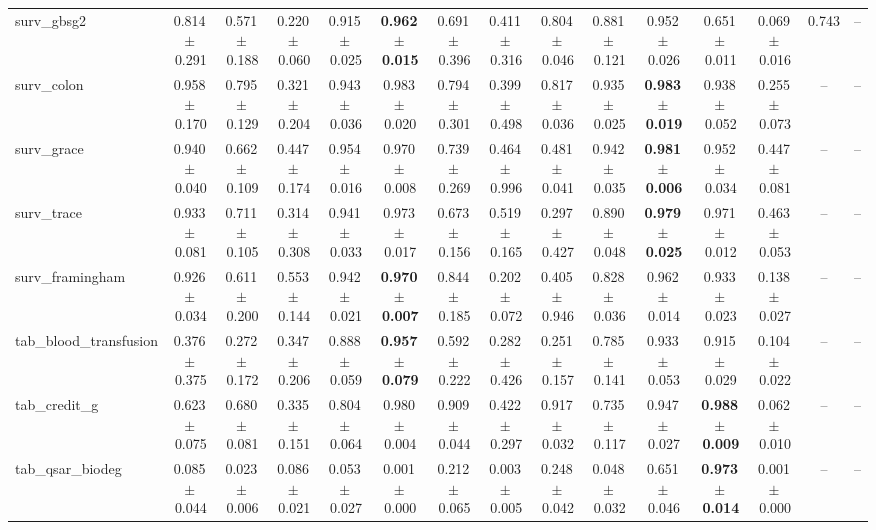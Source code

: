 \documentclass[8pt]{extarticle}
\begin{document}
\begin{longtable}{l*{14}{c}}
surv\_gbsg2 & 0.814\,$\pm$\,0.291 & 0.571\,$\pm$\,0.188 & 0.220\,$\pm$\,0.060 & 0.915\,$\pm$\,0.025 & \textbf{0.962\,$\pm$\,0.015} & 0.691\,$\pm$\,0.396 & 0.411\,$\pm$\,0.316 & 0.804\,$\pm$\,0.046 & 0.881\,$\pm$\,0.121 & 0.952\,$\pm$\,0.026 & 0.651\,$\pm$\,0.011 & 0.069\,$\pm$\,0.016 & 0.743 & -- \\
surv\_colon & 0.958\,$\pm$\,0.170 & 0.795\,$\pm$\,0.129 & 0.321\,$\pm$\,0.204 & 0.943\,$\pm$\,0.036 & 0.983\,$\pm$\,0.020 & 0.794\,$\pm$\,0.301 & 0.399\,$\pm$\,0.498 & 0.817\,$\pm$\,0.036 & 0.935\,$\pm$\,0.025 & \textbf{0.983\,$\pm$\,0.019} & 0.938\,$\pm$\,0.052 & 0.255\,$\pm$\,0.073 & -- & -- \\
surv\_grace & 0.940\,$\pm$\,0.040 & 0.662\,$\pm$\,0.109 & 0.447\,$\pm$\,0.174 & 0.954\,$\pm$\,0.016 & 0.970\,$\pm$\,0.008 & 0.739\,$\pm$\,0.269 & 0.464\,$\pm$\,0.996 & 0.481\,$\pm$\,0.041 & 0.942\,$\pm$\,0.035 & \textbf{0.981\,$\pm$\,0.006} & 0.952\,$\pm$\,0.034 & 0.447\,$\pm$\,0.081 & -- & -- \\
surv\_trace & 0.933\,$\pm$\,0.081 & 0.711\,$\pm$\,0.105 & 0.314\,$\pm$\,0.308 & 0.941\,$\pm$\,0.033 & 0.973\,$\pm$\,0.017 & 0.673\,$\pm$\,0.156 & 0.519\,$\pm$\,0.165 & 0.297\,$\pm$\,0.427 & 0.890\,$\pm$\,0.048 & \textbf{0.979\,$\pm$\,0.025} & 0.971\,$\pm$\,0.012 & 0.463\,$\pm$\,0.053 & -- & -- \\
surv\_framingham & 0.926\,$\pm$\,0.034 & 0.611\,$\pm$\,0.200 & 0.553\,$\pm$\,0.144 & 0.942\,$\pm$\,0.021 & \textbf{0.970\,$\pm$\,0.007} & 0.844\,$\pm$\,0.185 & 0.202\,$\pm$\,0.072 & 0.405\,$\pm$\,0.946 & 0.828\,$\pm$\,0.036 & 0.962\,$\pm$\,0.014 & 0.933\,$\pm$\,0.023 & 0.138\,$\pm$\,0.027 & -- & -- \\
tab\_blood\_transfusion & 0.376\,$\pm$\,0.375 & 0.272\,$\pm$\,0.172 & 0.347\,$\pm$\,0.206 & 0.888\,$\pm$\,0.059 & \textbf{0.957\,$\pm$\,0.079} & 0.592\,$\pm$\,0.222 & 0.282\,$\pm$\,0.426 & 0.251\,$\pm$\,0.157 & 0.785\,$\pm$\,0.141 & 0.933\,$\pm$\,0.053 & 0.915\,$\pm$\,0.029 & 0.104\,$\pm$\,0.022 & -- & -- \\
tab\_credit\_g & 0.623\,$\pm$\,0.075 & 0.680\,$\pm$\,0.081 & 0.335\,$\pm$\,0.151 & 0.804\,$\pm$\,0.064 & 0.980\,$\pm$\,0.004 & 0.909\,$\pm$\,0.044 & 0.422\,$\pm$\,0.297 & 0.917\,$\pm$\,0.032 & 0.735\,$\pm$\,0.117 & 0.947\,$\pm$\,0.027 & \textbf{0.988\,$\pm$\,0.009} & 0.062\,$\pm$\,0.010 & -- & -- \\
tab\_qsar\_biodeg & 0.085\,$\pm$\,0.044 & 0.023\,$\pm$\,0.006 & 0.086\,$\pm$\,0.021 & 0.053\,$\pm$\,0.027 & 0.001\,$\pm$\,0.000 & 0.212\,$\pm$\,0.065 & 0.003\,$\pm$\,0.005 & 0.248\,$\pm$\,0.042 & 0.048\,$\pm$\,0.032 & 0.651\,$\pm$\,0.046 & \textbf{0.973\,$\pm$\,0.014} & 0.001\,$\pm$\,0.000 & -- & -- \\

\end{longtable}
\end{document}
